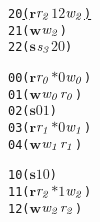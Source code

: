 \newsavebox{\boxthreeno}
\begin{lrbox}{\boxthreeno}
\begin{minipage}[t]{0.65\linewidth}
\large
\begin{alltt}
20 \underline{(\(\mathbf{r}\) \(\mathit{r\sb{2}}\) \(\mathit{1 2}\) \(\mathit{w\sb{2}}\))}
21 (\(\mathbf{w}\) \(\mathit{w\sb{2}}\))
22 (\(\mathbf{s}\) \(\mathit{s\sb{3}}\) \(\mathit{2 0}\))
\end{alltt}
\end{minipage}
\end{lrbox}


\newcommand\examplefigfour{
\begin{figure*}[tb]
\begin{center}
\setlength{\tabcolsep}{2pt}
\begin{tabular}[t]{c|c|c}
$p_0$ & $p_1$ & $p_2$ \\
\hline
\scalebox{0.8}{\usebox{\boxoneno}}&
\scalebox{0.8}{\usebox{\boxtwono}} &
\scalebox{0.8}{\usebox{\boxthreeno}}\\
\end{tabular}
\end{center}
\caption{No deadlock caused by circular dependency in messages.}
\label{fig:nodeadlock2}
\end{figure*}
}

\newsavebox{\boxonezerobuffer}
\begin{lrbox}{\boxonezerobuffer}
\begin{minipage}[t]{0.65\linewidth}
\large
\begin{alltt}
00 (\(\mathbf{r}\) \(\mathit{r\sb{0}}\) \(\mathit{\ast 0}\) \(\mathit{w\sb{0}}\)) 
01 (\(\mathbf{w}\) \(\mathit{w\sb{0}}\) \(\mathit{r\sb{0}}\))
02 (\(\mathbf{s}\) \(\mathit{0 1}\)) 
03 (\(\mathbf{r}\) \(\mathit{r\sb{1}}\) \(\mathit{\ast 0}\) \(\mathit{w\sb{1}}\)) 
04 (\(\mathbf{w}\) \(\mathit{w\sb{1}}\) \(\mathit{r\sb{1}}\))
\end{alltt}
\end{minipage}
\end{lrbox}

\newsavebox{\boxtwozerobuffer}
\begin{lrbox}{\boxtwozerobuffer}
\begin{minipage}[t]{0.65\linewidth}
\large
\begin{alltt}
10 (\(\mathbf{s}\) \(\mathit{1 0}\)) 
11 (\(\mathbf{r}\) \(\mathit{r\sb{2}}\) \(\mathit{\ast 1}\) \(\mathit{w\sb{2}}\)) 
12 (\(\mathbf{w}\) \(\mathit{w\sb{2}}\) \(\mathit{r\sb{2}}\))
\end{alltt}
\end{minipage}
\end{lrbox}

